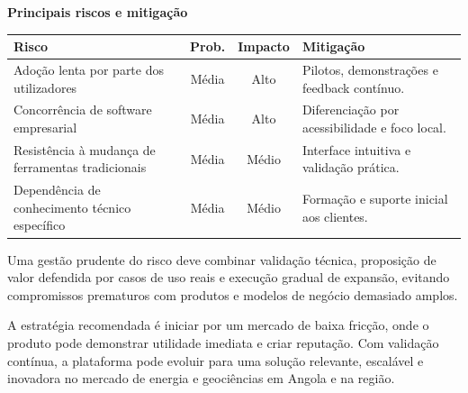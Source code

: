 \documentclass[11pt,a4paper]{article}
\begin{document}
\textbf{Principais riscos e mitigação}
\begin{table}[H]
\centering
\small
\begin{tabularx}{\textwidth}{>{\raggedright\arraybackslash}X|c|c|X}
\toprule
\textbf{Risco} & \textbf{Prob.} & \textbf{Impacto} & \textbf{Mitigação} \\
\midrule
Adoção lenta por parte dos utilizadores & Média & Alto & Pilotos, demonstrações e feedback contínuo. \\
Concorrência de software empresarial & Média & Alto & Diferenciação por acessibilidade e foco local. \\
Resistência à mudança de ferramentas tradicionais & Média & Médio & Interface intuitiva e validação prática. \\
Dependência de conhecimento técnico específico & Média & Médio & Formação e suporte inicial aos clientes. \\
\bottomrule
\end{tabularx}
\end{table}

Uma gestão prudente do risco deve combinar validação técnica, proposição de valor defendida por casos de uso reais e execução gradual de expansão, evitando compromissos prematuros com produtos e modelos de negócio demasiado amplos.



A estratégia recomendada é iniciar por um mercado de baixa fricção, onde o produto pode demonstrar utilidade imediata e criar reputação. Com validação contínua, a plataforma pode evoluir para uma solução relevante, escalável e inovadora no mercado de energia e geociências em Angola e na região.
\end{document}
